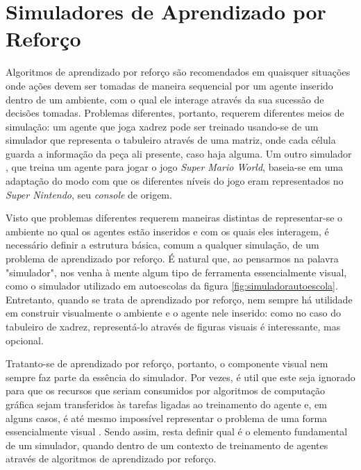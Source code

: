 \documentclass[cic,tc]{iiufrgs}
\begin{document}
\section{Simuladores de Aprendizado por Reforço}



Algoritmos de aprendizado por reforço são recomendados em quaisquer
situações onde ações devem ser tomadas de maneira sequencial por um agente
inserido dentro de um ambiente, com o qual ele interage através da sua sucessão
de decisões tomadas. Problemas diferentes, portanto, requerem diferentes meios
de simulação: um agente que joga xadrez \cite{Chess2017} pode ser treinado
usando-se de um simulador que representa o tabuleiro através de uma matriz, onde
cada célula guarda a informação da peça ali presente, caso haja alguma. Um outro
simulador \cite{Mario2009}, que treina um agente para jogar o jogo
\textit{Super Mario World}, baseia-se em uma adaptação do modo com que os
diferentes níveis do jogo eram representados no \textit{Super Nintendo}, seu
\textit{console} de origem.


Visto que problemas diferentes requerem maneiras distintas de representar-se o
ambiente no qual os agentes estão inseridos e com os quais eles interagem, é
necessário definir a estrutura básica, comum a qualquer simulação, de um
problema de aprendizado por reforço. É natural que, ao pensarmos na palavra
"simulador", nos venha à mente algum tipo de ferramenta essencialmente visual,
como o simulador utilizado em autoescolas da figura
\ref{fig:simuladorautoescola}. Entretanto, quando se trata de aprendizado por
reforço, nem sempre há utilidade em construir visualmente o ambiente e o agente
nele inserido: como no caso do tabuleiro de xadrez, representá-lo através de
figuras visuais é interessante, mas opcional.


Tratanto-se de aprendizado por reforço, portanto, o componente visual nem sempre
faz parte da essência do simulador. Por vezes, é util que este seja ignorado
para que os recursos que seriam consumidos por algoritmos de computação gráfica
sejam transferidos às tarefas ligadas ao treinamento do agente e, em alguns
casos, é até mesmo impossível representar o problema de uma forma essencialmente
visual \cite{Narasimhan2015}. Sendo assim, resta definir qual é o elemento
fundamental de um simulador, quando dentro de um contexto de treinamento de
agentes através de algoritmos de aprendizado por reforço.
\end{document}

